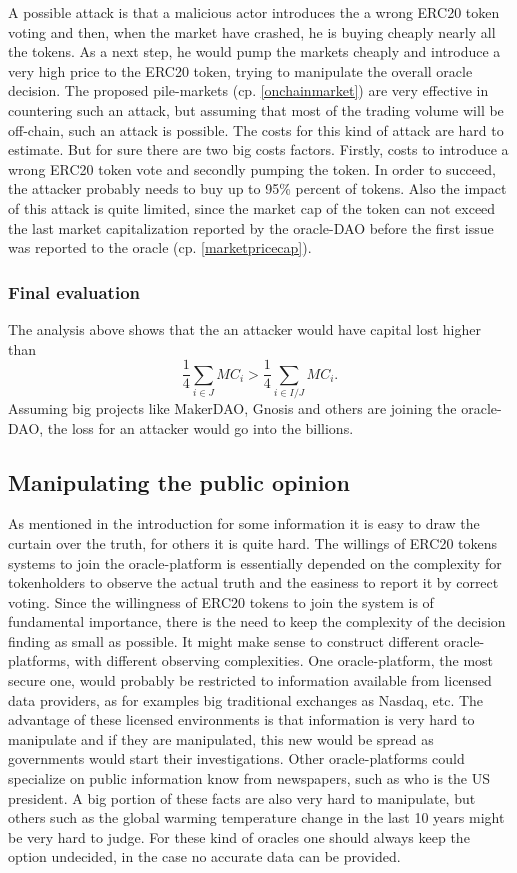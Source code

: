 \documentclass[a4paper]{article}
\begin{document}
A possible attack is that a malicious actor introduces the a wrong ERC20 token voting and then, when the market have crashed, he is buying cheaply nearly all the tokens. As a next step, he would pump the markets cheaply and introduce a very high price to the ERC20 token, trying to manipulate the overall oracle decision. The proposed pile-markets (cp. \ref{onchainmarket}) are very effective in countering such an attack, but assuming that most of the trading volume will be off-chain, such an attack is possible. The costs for this kind of attack are hard to estimate. But for sure there are two big costs factors. Firstly, costs to introduce a wrong ERC20 token vote and secondly pumping the token. In order to succeed, the attacker probably needs to buy up to 95\% percent of tokens. Also the impact of this attack is quite limited, since the market cap of the token can not exceed the last market capitalization reported by the oracle-DAO before the first issue was reported to the oracle (cp.  \ref{marketpricecap}).
\subsubsection*{Final evaluation}
The analysis above shows that the an attacker would have capital lost higher than $$
\frac{1}{4}\sum_{i\in J} MC_i >\frac{1}{4}\sum_{i\in I/J} MC_i .$$
Assuming big projects like MakerDAO, Gnosis and others are joining the oracle-DAO, the loss for an attacker would go into the billions.
\subsection{Manipulating the public opinion}
As mentioned in the introduction for some information it is easy to draw the curtain over the truth, for others it is quite hard. The willings of ERC20 tokens systems to join the oracle-platform is essentially depended on the complexity for tokenholders to observe the actual truth and the easiness to report it by correct voting. Since the willingness of ERC20 tokens to join the system is of fundamental importance, there is the need to keep the complexity of the decision finding as small as possible. It might make sense to construct different oracle-platforms, with different observing complexities.
One oracle-platform, the most secure one, would probably be restricted to information available from licensed data providers, as for examples big traditional exchanges as Nasdaq, etc. The advantage of these licensed environments is that information is very hard to manipulate and if they are manipulated, this new would be spread as governments would start their investigations.
Other oracle-platforms could specialize on public information know from newspapers, such as who is the US president. A big portion of these facts are also very hard to manipulate, but others such as the global warming temperature change in the last 10 years might be very hard to judge. For these kind of oracles one should always keep the option undecided, in the case no accurate data can be provided.
\end{document}
